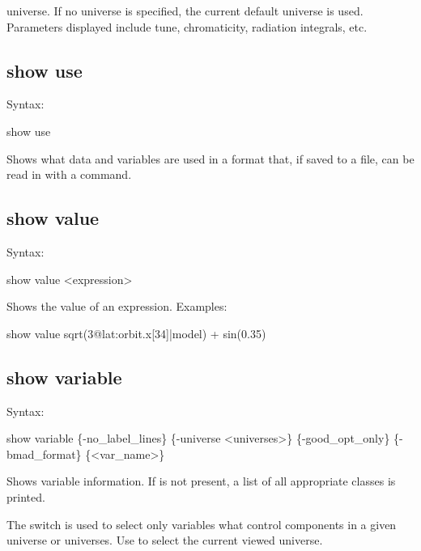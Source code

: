 {{{{{{universe. If no universe is specified, the current default universe is used. Parameters
displayed include tune, chromaticity, radiation integrals, etc.


\subsection{show use}
\label{s:show.use}

Syntax:
\begin{example}
  show use
\end{example}

Shows what data and variables are used in a format that, if saved to a file, can be read
in with a  command.


\subsection{show value}
\label{s:show.value}

Syntax:
\begin{example}
  show value <expression>
\end{example}


Shows the value of an expression. Examples:
\begin{example}
  show value sqrt(3@lat:orbit.x[34]|model) + sin(0.35)
\end{example}



\subsection{show variable}
\label{s:show.variable}

Syntax:
\begin{example}
  show variable \{-no_label_lines\} \{-universe <universes>\}            
         \{-good_opt_only\} \{-bmad_format\} \{<var_name>\}
\end{example}


Shows variable information. If  is not present, a list of all appropriate
 classes is printed.

The  switch is used to select only variables what control components in a
given universe or universes. Use  to select the current viewed universe.

}}}}}}
